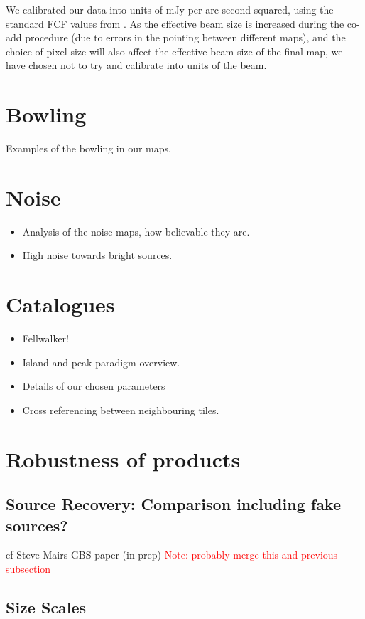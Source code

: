 \documentclass[usenatbib]{mn2e}
\newcommand{\note}[1]{\textcolor{red}{Note: #1}}
\begin{document}
We calibrated our data into units of mJy per arc-second squared, using
the standard FCF values from \citet{Dempsey2013}.  As the
effective beam size is increased during the co-add procedure (due to
errors in the pointing between different maps), and the choice of
pixel size will also affect the effective beam size of the final map,
we have chosen not to try and calibrate into units of the beam.


\section{Bowling}
Examples of the bowling in our maps.

\section{Noise}
\begin{itemize}
\item Analysis of the noise maps, how believable they are.
\item High noise towards bright sources.
\end{itemize}



\section{Catalogues}
\begin{itemize}
\item Fellwalker! \citep{Berry2015}
\item Island and peak paradigm overview.
\item Details of our chosen parameters
\item Cross referencing between neighbouring tiles.
\end{itemize}


\section{Robustness of products}

\subsection{Source Recovery: Comparison including fake sources?}
cf Steve Mairs GBS paper (in prep)
\note{ probably merge this and previous subsection}

\subsection{Size Scales}
\end{document}
